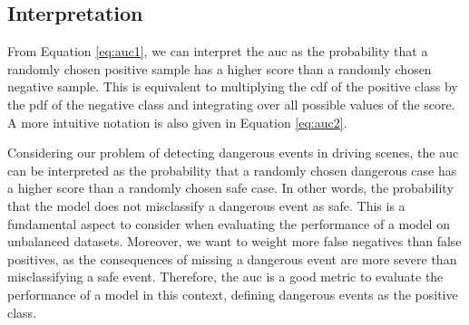 \begin{appendices}
\section{Interpretation}
From Equation \ref{eq:auc1}, we can interpret the \ac{auc} as the probability that 
a randomly chosen positive sample has a higher score than a randomly chosen negative 
sample. This is equivalent to multiplying the \ac{cdf} of the positive class by the 
\ac{pdf} of the negative class and integrating over all possible values of the score.
A more intuitive notation is also given in Equation \ref{eq:auc2}.

Considering our problem of detecting dangerous events in driving scenes, the 
\ac{auc} can be interpreted as the probability that a randomly chosen dangerous 
case has a higher score than a randomly chosen safe case. In other words, the 
probability that the model does not misclassify a dangerous event as safe. 
This is a fundamental aspect to consider when evaluating the performance of 
a model on unbalanced datasets. Moreover, we want to weight more false negatives 
than false positives, as the consequences of missing a dangerous event are more 
severe than misclassifying a safe event. Therefore, the \ac{auc} is a good metric 
to evaluate the performance of a model in this context, defining dangerous events 
as the positive class.

\end{appendices}